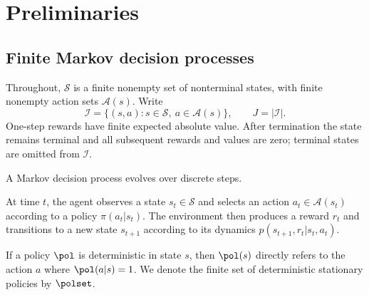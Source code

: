 
\section{Preliminaries}
\label{sec: mcopi}




\subsection{Finite Markov decision processes}
Throughout, $\mathcal S$ is a finite nonempty set of nonterminal states, with finite nonempty action sets $\mathcal A(s)$. Write
\[
\mathcal I=\{(s,a):s\in\mathcal S,\ a\in\mathcal A(s)\},\qquad J=|\mathcal I|.
\]
One-step rewards have finite expected absolute value. After termination the state remains terminal and all subsequent rewards and values are zero; terminal states are omitted from $\mathcal I$.































A Markov decision process evolves over discrete steps.

At time \(t\), the agent observes a state \(s_t \in \mathcal S\) and selects an action \(a_t \in \mathcal A(s_t)\) according to a policy \(\pi(a_t | s_t)\).
The environment then produces a reward \(r_t\) and transitions to a new state \(s_{t+1}\) according to its dynamics $p(s_{t+1}, r_t | s_t, a_t)$.



If a policy $\pol$ is deterministic in state $s$, then $\pol(s)$ directly refers to the action $a$ where $\pol(a | s) = 1$.
We denote the finite set of deterministic stationary policies by $\polset$.









































